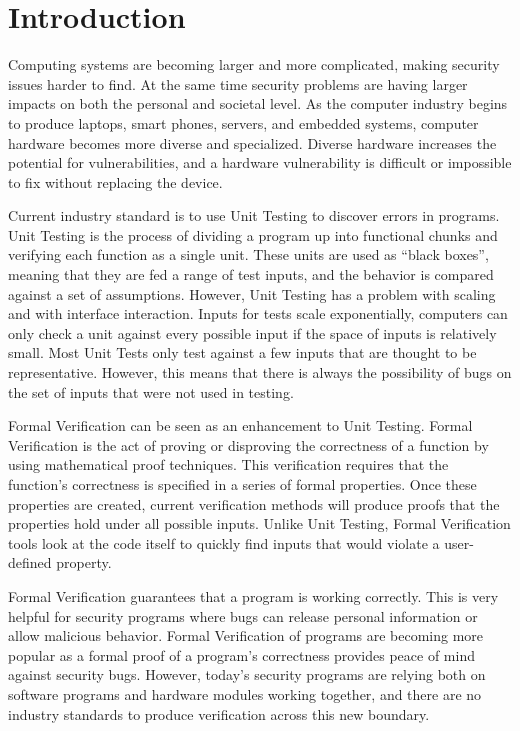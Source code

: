 \chapter{Introduction}

Computing systems are becoming larger and more complicated, making security
issues harder to find.
At the same time security problems are having larger impacts on both the personal and societal level.
As the computer industry begins to produce laptops, smart phones, servers, and embedded systems, computer
hardware becomes more diverse and specialized. Diverse hardware increases the
potential for vulnerabilities, and a hardware vulnerability is difficult or
impossible to fix without replacing the device. 

Current industry standard is to use Unit Testing to discover errors in programs. 
Unit Testing is the process of dividing a program up into functional chunks and
verifying each function as a single unit. 
These units are used as ``black boxes'', meaning that they are fed a range
of test inputs, and the behavior is compared against a set of assumptions.
However, Unit Testing has a problem with scaling and with interface interaction.
Inputs for tests scale exponentially, computers can only check a unit against
every possible input if the space of inputs is relatively small. 
Most Unit Tests only test against a few inputs that are thought to be
representative. 
However, this means that there is always the possibility of bugs
on the set of inputs that were not used in testing.

Formal Verification can be seen as an enhancement to Unit Testing. 
Formal Verification is the act of proving or disproving the correctness of a
function by using mathematical proof techniques. 
This verification requires that the function's correctness is specified in a
series of formal properties.
Once these properties are created, current verification methods 
will produce proofs that the properties hold under all possible inputs.
Unlike Unit Testing, Formal Verification tools look at the code itself to quickly find inputs that would violate a user-defined property. 

Formal Verification guarantees that a program is working correctly. 
This is very helpful for security programs where bugs can release personal information or allow malicious behavior.
Formal Verification of programs are becoming more popular as a formal proof of
a program's correctness provides peace of mind against security bugs.
However, today's security programs are relying both on software programs and
hardware modules working together, and there are no industry standards to
produce verification across this new boundary.

